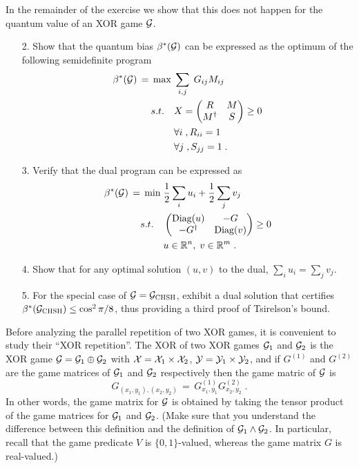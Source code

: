 \begin{exercise}
In the remainder of the exercise we show that this does not happen for the quantum value of an XOR game $\mathcal{G}$. 
\begin{enumerate}
\item[2.] Show that the quantum bias $\beta^*(\mathcal{G})$ can be expressed as the optimum of the following semidefinite program
\begin{align*}
 \beta^*(\mathcal{G}) \,=\, \max \;&  \sum_{i,j}\; G_{ij} M_{ij} \\
s.t. \quad &  X = \begin{pmatrix} R & M \\ M^\dagger & S \end{pmatrix} \geq 0 \\
& \forall i\;, R_{ii}=1\\
& \forall j\;, S_{jj}=1\;.
\end{align*}
\item[3.] Verify that the dual program can be expressed as 
\begin{align}
 \beta^*(\mathcal{G}) \,=\, \min\; &  \frac{1}{2}\sum_{i} u_i + \frac{1}{2} \sum_j v_j\label{eq:dual-xor}\\
s.t. \quad&  \begin{pmatrix} \text{Diag}(u) & -G \\ -G^\dagger & \text{Diag}(v) \end{pmatrix} \geq 0 \notag\\
& u\in \mathbb{R}^n,\; v\in \mathbb{R}^m\;.\notag
\end{align}
\item[4.] Show that for any optimal solution $(u,v)$ to the dual, $\sum_i u_i = \sum_j v_j$. 
\item[5.] For the special case of $\mathcal{G} = \mathcal{G}_{\textsc{CHSH}}$, exhibit a dual solution that certifies $\beta^*(\mathcal{G}_{\textsc{CHSH}})\leq \cos^2\pi/8$, thus providing a third proof of Tsirelson's bound. 
\end{enumerate}
Before analyzing the parallel repetition of two XOR games, it is convenient to study their ``XOR repetition''. The XOR of two XOR games $\mathcal{G}_1$ and $\mathcal{G}_2$ is the XOR game $\mathcal{G} = \mathcal{G}_1\oplus \mathcal{G}_2$ with $\mathcal{X}=\mathcal{X}_1\times \mathcal{X}_2$, $\mathcal{Y}=\mathcal{Y}_1\times \mathcal{Y}_2$, and if $G^{(1)}$ and $G^{(2)}$ are the game matrices of $\mathcal{G}_1$ and $\mathcal{G}_2$ respectively then the game matric of $\mathcal{G}$ is  
\[ G_{(x_1,y_1),(x_2,y_2)} \,=\, G^{(1)}_{x_1,y_1} G^{(2)}_{x_2,y_2}\;.\]
In other words, the game matrix for $\mathcal{G}$ is obtained by taking the tensor product of the game matrices for $\mathcal{G}_1$ and $\mathcal{G}_2$. (Make sure that you understand the difference between this definition and the definition of $\mathcal{G}_1\wedge \mathcal{G}_2$. In particular, recall that the game predicate $V$ is $\{0,1\}$-valued, whereas the game matrix $G$ is real-valued.)

\end{exercise}

